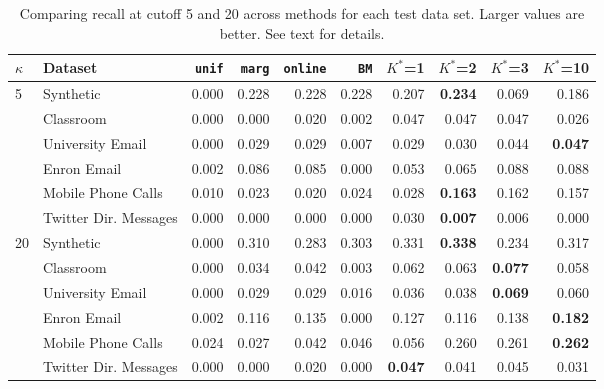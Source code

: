 \begin{table}[t]
\begin{center}
{\footnotesize
\begin{tabular}{llrrrrrrrr}
  \hline
$\kappa$ & Dataset & \texttt{unif} & \texttt{marg} & \texttt{online} & \texttt{BM} & $K^*$=1 & $K^*$=2 & $K^*$=3 & $K^*$=10 \\ 
  \hline
5 & Synthetic & 0.000 & 0.228 & 0.228 & 0.228 & 0.207 & \textbf{0.234} & 0.069 & 0.186 \\ 
   & Classroom & 0.000 & 0.000 & 0.020 & 0.002 & 0.047 & 0.047 & 0.047 & 0.026 \\ 
   & University Email & 0.000 & 0.029 & 0.029 & 0.007 & 0.029 & 0.030 & 0.044 & \textbf{0.047} \\ 
   & Enron Email & 0.002 & 0.086 & 0.085 & 0.000 & 0.053 & 0.065 & 0.088 & 0.088 \\ 
   & Mobile Phone Calls & 0.010 & 0.023 & 0.020 & 0.024 & 0.028 & \textbf{0.163} & 0.162 & 0.157 \\ 
   & Twitter Dir. Messages & 0.000 & 0.000 & 0.000 & 0.000 & 0.030 & \textbf{0.007} & 0.006 & 0.000 \\ 
  20 & Synthetic & 0.000 & 0.310 & 0.283 & 0.303 & 0.331 & \textbf{0.338} & 0.234 & 0.317 \\ 
   & Classroom & 0.000 & 0.034 & 0.042 & 0.003 & 0.062 & 0.063 & \textbf{0.077} & 0.058 \\ 
   & University Email & 0.000 & 0.029 & 0.029 & 0.016 & 0.036 & 0.038 & \textbf{0.069} & 0.060 \\ 
   & Enron Email & 0.002 & 0.116 & 0.135 & 0.000 & 0.127 & 0.116 & 0.138 & \textbf{0.182} \\ 
   & Mobile Phone Calls & 0.024 & 0.027 & 0.042 & 0.046 & 0.056 & 0.260 & 0.261 & \textbf{0.262} \\ 
   & Twitter Dir. Messages & 0.000 & 0.000 & 0.020 & 0.000 & \textbf{0.047} & 0.041 & 0.045 & 0.031 \\ 
   \hline
\end{tabular}
}
\caption{Comparing recall at cutoff 5 and 20 across methods for each test data set.  Larger values are better.  See text for details.}
\label{tab:recall20}
\end{center}
\end{table}
